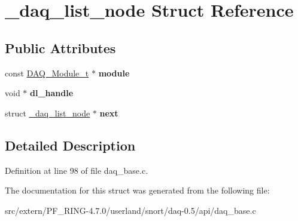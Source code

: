 \hypertarget{struct__daq__list__node}{
\section{\_\-daq\_\-list\_\-node Struct Reference}
\label{struct__daq__list__node}
}
\subsection*{Public Attributes}
\begin{DoxyCompactItemize}
\item 
\hypertarget{struct__daq__list__node_a8a2c316b5ec819e28c9cd001a5a16ae0}{
const \hyperlink{struct__daq__module}{DAQ\_\-Module\_\-t} $\ast$ {\bfseries module}}
\label{struct__daq__list__node_a8a2c316b5ec819e28c9cd001a5a16ae0}

\item 
\hypertarget{struct__daq__list__node_a5e33974f17a6bc8baae805fb245060dc}{
void $\ast$ {\bfseries dl\_\-handle}}
\label{struct__daq__list__node_a5e33974f17a6bc8baae805fb245060dc}

\item 
\hypertarget{struct__daq__list__node_a0e0c5b394688965e423ecf39ebf0ce5a}{
struct \hyperlink{struct__daq__list__node}{\_\-daq\_\-list\_\-node} $\ast$ {\bfseries next}}
\label{struct__daq__list__node_a0e0c5b394688965e423ecf39ebf0ce5a}

\end{DoxyCompactItemize}


\subsection{Detailed Description}


Definition at line 98 of file daq\_\-base.c.



The documentation for this struct was generated from the following file:\begin{DoxyCompactItemize}
\item 
src/extern/PF\_\-RING-\/4.7.0/userland/snort/daq-\/0.5/api/daq\_\-base.c\end{DoxyCompactItemize}
